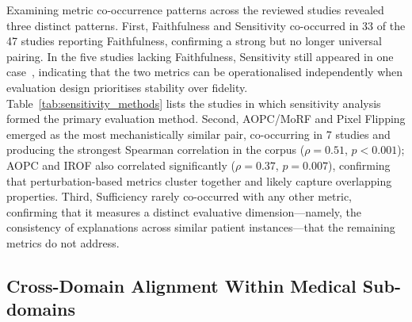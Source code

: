 Examining metric co-occurrence patterns across the reviewed studies
revealed three distinct patterns. First, Faithfulness and Sensitivity
co-occurred in 33 of the 47 studies reporting Faithfulness, confirming a
strong but no longer universal pairing. In the five studies lacking
Faithfulness, Sensitivity still appeared in one case~\cite{qin2025consistency},
indicating that the two metrics can be operationalised independently when
evaluation design prioritises stability over fidelity. Table~\ref{tab:sensitivity_methods}
lists the studies in which sensitivity analysis formed the primary evaluation method.
Second, AOPC/MoRF and Pixel Flipping emerged as the most mechanistically similar
pair, co-occurring in 7 studies and producing the strongest Spearman correlation in the
corpus ($\rho = 0.51$, $p < 0.001$); AOPC and IROF also correlated significantly
($\rho = 0.37$, $p = 0.007$), confirming that perturbation-based metrics cluster together
and likely capture overlapping properties. Third, Sufficiency rarely co-occurred with any
other metric, confirming that it measures a distinct evaluative dimension---namely,
the consistency of explanations across similar patient instances---that the remaining
metrics do not address.


 

\subsection{Cross-Domain Alignment Within Medical Sub-domains}

